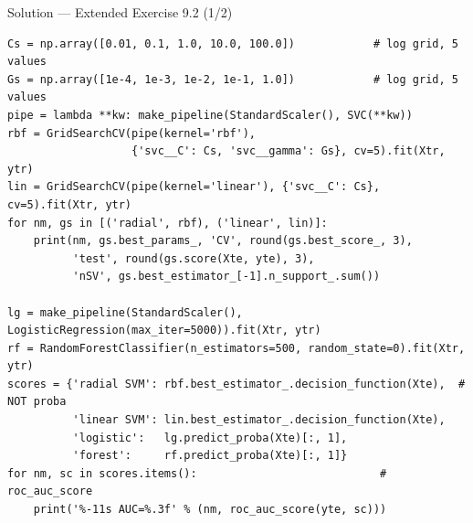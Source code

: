 \documentclass[aspectratio=169,11pt]{beamer}
\begin{document}
\begin{frame}[fragile]{Solution --- Extended Exercise 9.2 (1/2)}
\begin{solutionbox}
\begin{lstlisting}[basicstyle=\ttfamily\tiny]
Cs = np.array([0.01, 0.1, 1.0, 10.0, 100.0])            # log grid, 5 values
Gs = np.array([1e-4, 1e-3, 1e-2, 1e-1, 1.0])            # log grid, 5 values
pipe = lambda **kw: make_pipeline(StandardScaler(), SVC(**kw))
rbf = GridSearchCV(pipe(kernel='rbf'),
                   {'svc__C': Cs, 'svc__gamma': Gs}, cv=5).fit(Xtr, ytr)
lin = GridSearchCV(pipe(kernel='linear'), {'svc__C': Cs}, cv=5).fit(Xtr, ytr)
for nm, gs in [('radial', rbf), ('linear', lin)]:
    print(nm, gs.best_params_, 'CV', round(gs.best_score_, 3),
          'test', round(gs.score(Xte, yte), 3),
          'nSV', gs.best_estimator_[-1].n_support_.sum())

lg = make_pipeline(StandardScaler(), LogisticRegression(max_iter=5000)).fit(Xtr, ytr)
rf = RandomForestClassifier(n_estimators=500, random_state=0).fit(Xtr, ytr)
scores = {'radial SVM': rbf.best_estimator_.decision_function(Xte),  # NOT proba
          'linear SVM': lin.best_estimator_.decision_function(Xte),
          'logistic':   lg.predict_proba(Xte)[:, 1],
          'forest':     rf.predict_proba(Xte)[:, 1]}
for nm, sc in scores.items():                            # roc_auc_score
    print('%-11s AUC=%.3f' % (nm, roc_auc_score(yte, sc)))
\end{lstlisting}
\end{solutionbox}
\end{frame}
\end{document}
